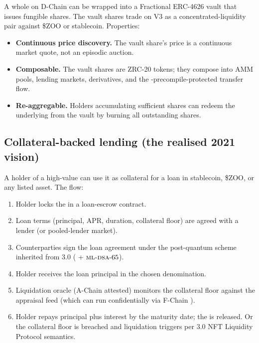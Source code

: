 A whole \NFT{} on \Zoo{} D-Chain can be wrapped into a Fractional
ERC-4626 vault that issues fungible shares. The vault shares trade
on \Zoo{} \DEX{} V3 as a concentrated-liquidity pair against
\$ZOO or stablecoin. Properties:

\begin{itemize}[leftmargin=1.2em]
  \item \textbf{Continuous price discovery.} The vault share's price
        is a continuous market quote, not an episodic auction.
  \item \textbf{Composable.} The vault shares are ZRC-20 tokens;
        they compose into AMM pools, lending markets, derivatives,
        and the \Liquidity{}-precompile-protected transfer flow.
  \item \textbf{Re-aggregable.} Holders accumulating sufficient
        shares can redeem the underlying \NFT{} from the vault by
        burning all outstanding shares.
\end{itemize}

\subsection{Collateral-backed lending (the realised 2021 vision)}

A holder of a high-value \NFT{} can use it as collateral for a loan
in stablecoin, \$ZOO, or any listed asset. The flow:

\begin{enumerate}[leftmargin=1.4em]
  \item Holder locks the \NFT{} in a loan-escrow contract.
  \item Loan terms (principal, APR, duration, collateral floor)
        are agreed with a lender (or pooled-lender market).
  \item Counterparties sign the loan agreement under the post-quantum
        scheme inherited from \Zoo{} 3.0 \cite{zoo-3-0} (\Ringtail{}
        + $\textsc{ml-dsa}{}\text{-}65$).
  \item Holder receives the loan principal in the chosen denomination.
  \item Liquidation oracle (A-Chain attested) monitors the
        collateral floor against the appraisal feed (which can run
        confidentially via F-Chain \cite{lp-013}).
  \item Holder repays principal plus interest by the maturity date;
        the \NFT{} is released. Or the collateral floor is breached
        and liquidation triggers per \Zoo{} 3.0 NFT Liquidity
        Protocol semantics.
\end{enumerate}

